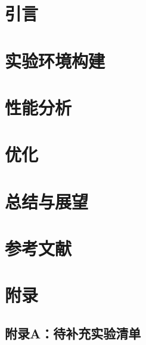 \documentclass[12pt, a4paper, fontset=macnew]{ctexart}
\begin{document}
\section{引言}\label{ch:intro}


\section{实验环境构建}\label{ch:env}


\section{性能分析}\label{ch:perf}


\section{优化}\label{ch:opt}


\section{总结与展望}\label{ch:summary}


\clearpage
\section*{参考文献}

\printbibliography[heading=none]

\clearpage
\section*{附\quad 录}

\subsection*{附录A：待补充实验清单}
\end{document}
